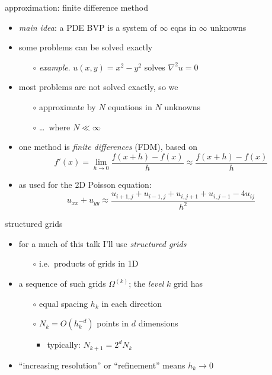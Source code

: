 \documentclass[hide notes,intlimits,usenames,dvipsnames]{beamer}
\newcommand{\grad}{\nabla}
\begin{document}
\begin{frame}{approximation: finite difference method}
\begin{itemize}
\item \emph{main idea}: a PDE BVP is a system of $\infty$ eqns in $\infty$ unknowns
\item some problems can be solved exactly
	\begin{itemize}
	\item[$\circ$] \emph{example}.  $u(x,y)=x^2-y^2$ solves $\grad^2 u = 0$
	\end{itemize}
\item most problems are not solved exactly, so we
	\begin{itemize}
	\item[$\circ$] \alert{approximate by $N$ equations in $N$ unknowns}
	\item[$\circ$] \dots \, where $N \ll \infty$
	\end{itemize}
\item one method is \emph{finite differences} (FDM), based on
	    $$f'(x) = \lim_{h \to 0} \frac{f(x+h)-f(x)}{h} \approx \frac{f(x+h)-f(x)}{h}$$
\item as used for the 2D Poisson equation:
	    $$u_{xx}+u_{yy} \approx \frac{u_{i+1,j} + u_{i-1,j} + u_{i,j+1} + u_{i,j-1} - 4 u_{ij}}{h^2}$$
\end{itemize}
\end{frame}


\begin{frame}{structured grids}
\begin{itemize}
\item for a much of this talk I'll use \emph{structured grids}
	\begin{itemize}
	\item[$\circ$] i.e.~products of grids in 1D
	\end{itemize}
\item a sequence of such grids $\Omega^{(k)}$; the \emph{level} $k$ grid has
	\begin{itemize}
	\item[$\circ$] equal spacing $h_k$ in each direction
    \item[$\circ$] $N_k = O(h_k^{-d})$ points in $d$ dimensions
	    \begin{itemize}
	    \item typically: $N_{k+1} = 2^d N_k$
	    \end{itemize}
	\end{itemize}

\bigskip


\medskip
\item ``increasing resolution'' or ``refinement'' means $h_k \to 0$
\end{itemize}
\end{frame}
\end{document}

